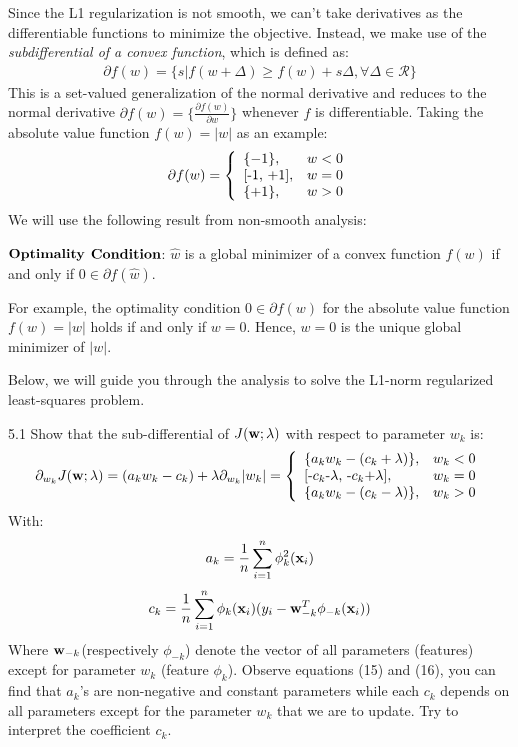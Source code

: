 \documentclass{article}
\theoremstyle{definition}
\theoremstyle{definition}
\theoremstyle{remark}
\begin{document}
Since the L1 regularization is not smooth, we can't take derivatives as the differentiable functions to minimize the objective. Instead, we make use of the \emph{subdifferential of a convex function}, which is defined as:
\begin{eqnarray}
\partial f(w)=\{s|f(w+\Delta)\geq f(w)+s\Delta, \forall \Delta\in\mathcal{R}\}
\end{eqnarray}
This is a set-valued generalization of the normal derivative and reduces to the normal derivative $\partial f(w)=\{\frac{\partial f(w)}{\partial w}\}$ whenever $f$ is differentiable. Taking the absolute value function $f(w)=|w|$ as an example:
\begin{displaymath}
\partial f(w)= \left\{ \begin{array}{ll}
\{-1\}, & \textrm{$w<0$} \\
$[-1, +1]$, & \textrm{$w=0$} \\
\{+1\}, & \textrm{$w>0$}
\end{array} \right.
\end{displaymath}
We will use the following result from non-smooth analysis:

$\bold{Optimality}$ $\bold{Condition}$: $\hat{w}$ is a global minimizer of a convex function $f(w)$ if and only if $0\in \partial f(\hat{w})$.

For example, the optimality condition $0 \in \partial f(w)$ for the absolute value function $f(w)=|w|$ holds if and only if $w=0$. Hence, $w=0$ is the unique global minimizer of $|w|$.

Below, we will guide you through the analysis to solve the L1-norm regularized least-squares problem.

5.1 Show that the sub-differential of $J(\bold{w};\lambda)$ with respect to parameter $w_{k}$ is:
\begin{displaymath}
\partial_{w_{k}}J(\bold{w};\lambda)=(a_{k}w_{k}-c_{k})+\lambda\partial_{w_{k}}|w_{k}| =\left\{ \begin{array}{ll}
\{a_{k}w_{k}-(c_{k}+\lambda)\}, & \textrm{$w_{k}<0$} \\
$[-$c_{k}$-$\lambda$, -$c_{k}$+$\lambda$]$, & \textrm{$w_{k}=0$} \\
\{a_{k}w_{k}-(c_{k}-\lambda)\}, & \textrm{$w_{k}>0$}
\end{array} \right.
\end{displaymath}
With:
\begin{eqnarray}
a_{k}=\frac{1}{n}\sum_{i=1}^{n}\phi_{k}^{2}(\bold{x}_{i})
\end{eqnarray}
\begin{eqnarray}
c_{k}=\frac{1}{n}\sum_{i=1}^{n}\phi_{k}(\bold{x}_{i})(y_{i}-\bold{w}_{-k}^{T}\phi_{-k}(\bold{x}_{i}))
\end{eqnarray}
Where $\bold{w}_{-k}$(respectively $\phi_{-k}$) denote the vector of all parameters (features) except for parameter $w_{k}$ (feature $\phi_{k}$). Observe equations (15) and (16), you can find that $a_{k}$'s are non-negative and constant parameters while each $c_{k}$ depends on all parameters except for the parameter $w_{k}$ that we are to update. Try to interpret the coefficient $c_{k}$.
\end{document}
